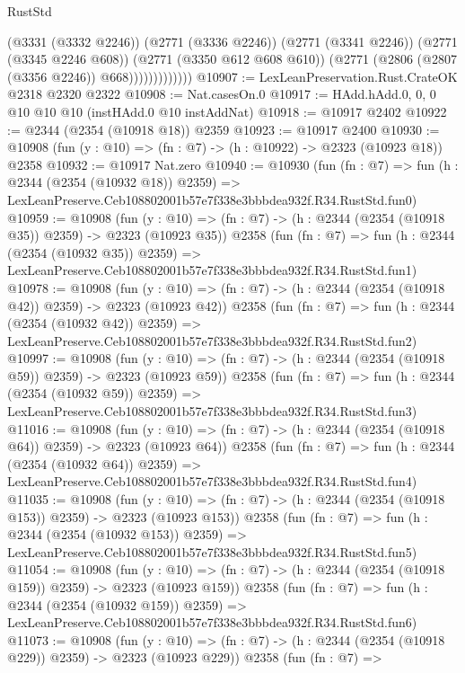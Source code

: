 \begin{lexlean}{RustStd}
\begin{coremodule}
                          (@3331 (@3332 @2246))
                          (@2771 (@3336 @2246))
                          (@2771 (@3341 @2246))
                          (@2771 (@3345 @2246 @608))
                          (@2771 (@3350 @612 @608 @610))
                          (@2771 (@2806 (@2807 (@3356 @2246)) @668)))))))))))))
@10907 := LexLeanPreservation.Rust.CrateOK @2318 @2320 @2322
@10908 := Nat.casesOn.{0}
@10917 := HAdd.hAdd.{0, 0, 0} @10 @10 @10 (instHAdd.{0} @10 instAddNat)
@10918 := @10917 @2402
@10922 := @2344 (@2354 (@10918 @18)) @2359
@10923 := @10917 @2400
@10930 := @10908 (fun (y : @10) => (fn : @7) -> (h : @10922) -> @2323 (@10923 @18)) @2358
@10932 := @10917 Nat.zero
@10940 := @10930
    (fun (fn : @7) =>
    fun (h : @2344 (@2354 (@10932 @18)) @2359) =>
    LexLeanPreserve.Ceb108802001b57e7f338e3bbbdea932f.R34.RustStd.fun0)
@10959 := @10908
    (fun (y : @10) => (fn : @7) -> (h : @2344 (@2354 (@10918 @35)) @2359) -> @2323 (@10923 @35))
    @2358
    (fun (fn : @7) =>
    fun (h : @2344 (@2354 (@10932 @35)) @2359) =>
    LexLeanPreserve.Ceb108802001b57e7f338e3bbbdea932f.R34.RustStd.fun1)
@10978 := @10908
    (fun (y : @10) => (fn : @7) -> (h : @2344 (@2354 (@10918 @42)) @2359) -> @2323 (@10923 @42))
    @2358
    (fun (fn : @7) =>
    fun (h : @2344 (@2354 (@10932 @42)) @2359) =>
    LexLeanPreserve.Ceb108802001b57e7f338e3bbbdea932f.R34.RustStd.fun2)
@10997 := @10908
    (fun (y : @10) => (fn : @7) -> (h : @2344 (@2354 (@10918 @59)) @2359) -> @2323 (@10923 @59))
    @2358
    (fun (fn : @7) =>
    fun (h : @2344 (@2354 (@10932 @59)) @2359) =>
    LexLeanPreserve.Ceb108802001b57e7f338e3bbbdea932f.R34.RustStd.fun3)
@11016 := @10908
    (fun (y : @10) => (fn : @7) -> (h : @2344 (@2354 (@10918 @64)) @2359) -> @2323 (@10923 @64))
    @2358
    (fun (fn : @7) =>
    fun (h : @2344 (@2354 (@10932 @64)) @2359) =>
    LexLeanPreserve.Ceb108802001b57e7f338e3bbbdea932f.R34.RustStd.fun4)
@11035 := @10908
    (fun (y : @10) => (fn : @7) -> (h : @2344 (@2354 (@10918 @153)) @2359) -> @2323 (@10923 @153))
    @2358
    (fun (fn : @7) =>
    fun (h : @2344 (@2354 (@10932 @153)) @2359) =>
    LexLeanPreserve.Ceb108802001b57e7f338e3bbbdea932f.R34.RustStd.fun5)
@11054 := @10908
    (fun (y : @10) => (fn : @7) -> (h : @2344 (@2354 (@10918 @159)) @2359) -> @2323 (@10923 @159))
    @2358
    (fun (fn : @7) =>
    fun (h : @2344 (@2354 (@10932 @159)) @2359) =>
    LexLeanPreserve.Ceb108802001b57e7f338e3bbbdea932f.R34.RustStd.fun6)
@11073 := @10908
    (fun (y : @10) => (fn : @7) -> (h : @2344 (@2354 (@10918 @229)) @2359) -> @2323 (@10923 @229))
    @2358
    (fun (fn : @7) =>

\end{coremodule}
\end{lexlean}
